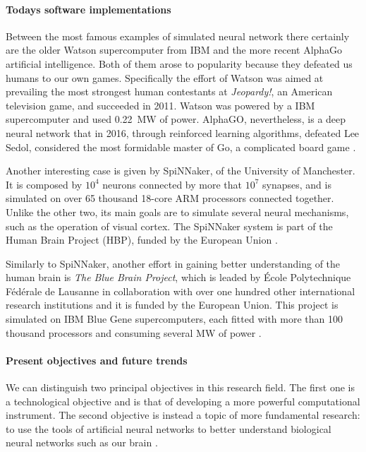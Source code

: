 \paragraph{Todays software implementations\\}
Between the most famous examples of simulated neural network there certainly are the older Watson supercomputer from IBM and the more recent AlphaGo artificial intelligence.
Both of them arose to popularity because they defeated us humans to our own games.
Specifically the effort of Watson was aimed at prevailing the most strongest human contestants at \textit{Jeopardy!}, an American television game, and succeeded in 2011.
Watson was powered by a IBM supercomputer and used \SI{0.22}{\MW} of power.
AlphaGO, nevertheless, is a deep neural network that in 2016, through reinforced learning algorithms, defeated Lee Sedol, considered the most formidable master of Go, a complicated board game \cite{Nawrocki2016a}.

Another interesting case is given by SpiNNaker, of the University of Manchester.
It is composed by $10^4$ neurons connected by more that $10^7$ synapses, and is simulated on over 65 thousand 18-core ARM processors connected together.
Unlike the other two, its main goals are to simulate several neural mechanisms, such as the operation of visual cortex.
The SpiNNaker system is part of the Human Brain Project (HBP), funded by the European Union \cite{HBP.eu, Nawrocki2016a}.

Similarly to SpiNNaker, another effort in gaining better understanding of the human brain is \textit{The Blue Brain Project}, which is leaded by École Polytechnique Fédérale de Lausanne in collaboration with over one hundred other international research institutions and it is funded by the European Union.
This project is simulated on IBM Blue Gene supercomputers, each fitted with more than 100 thousand processors and consuming several \si{\MW} of power \cite{Nawrocki2016a}.

\paragraph{Present objectives and future trends\\}
We can distinguish two principal objectives in this research field.
The first one is a technological objective and is that of developing a more powerful computational instrument.
The second objective is instead a topic of more fundamental research: to use the tools of artificial neural networks to better understand biological neural networks such as our brain \cite{sciamHBP, HBP.eu}.

